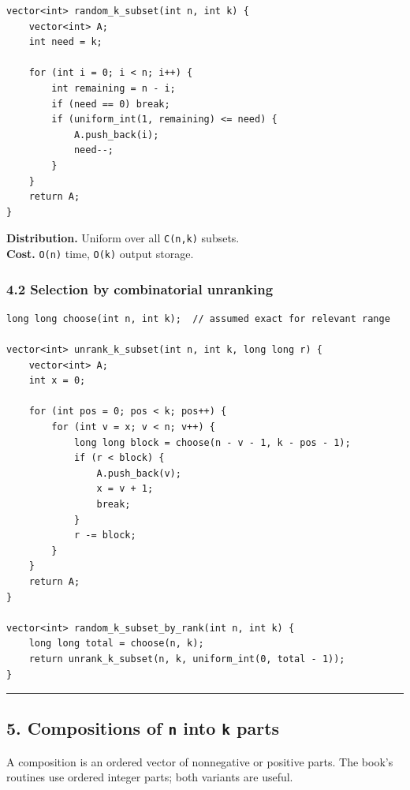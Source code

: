 \documentclass[11pt]{article}
\begin{document}
\begin{verbatim}
vector<int> random_k_subset(int n, int k) {
    vector<int> A;
    int need = k;

    for (int i = 0; i < n; i++) {
        int remaining = n - i;
        if (need == 0) break;
        if (uniform_int(1, remaining) <= need) {
            A.push_back(i);
            need--;
        }
    }
    return A;
}
\end{verbatim}

\textbf{Distribution.} Uniform over all \texttt{C(n,k)} subsets.\\
\textbf{Cost.} \texttt{O(n)} time, \texttt{O(k)} output storage.

\subsubsection{4.2 Selection by combinatorial unranking}\label{selection-by-combinatorial-unranking}

\begin{verbatim}
long long choose(int n, int k);  // assumed exact for relevant range

vector<int> unrank_k_subset(int n, int k, long long r) {
    vector<int> A;
    int x = 0;

    for (int pos = 0; pos < k; pos++) {
        for (int v = x; v < n; v++) {
            long long block = choose(n - v - 1, k - pos - 1);
            if (r < block) {
                A.push_back(v);
                x = v + 1;
                break;
            }
            r -= block;
        }
    }
    return A;
}

vector<int> random_k_subset_by_rank(int n, int k) {
    long long total = choose(n, k);
    return unrank_k_subset(n, k, uniform_int(0, total - 1));
}
\end{verbatim}

\begin{center}\rule{0.5\linewidth}{0.5pt}\end{center}

\subsection{\texorpdfstring{5. Compositions of \texttt{n} into \texttt{k} parts}{5. Compositions of n into k parts}}\label{compositions-of-n-into-k-parts}

A composition is an ordered vector of nonnegative or positive parts. The book's routines use ordered integer parts; both variants are useful.
\end{document}
